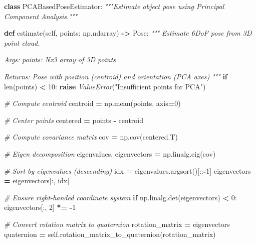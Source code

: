 \documentclass[
]{article}
\newenvironment{Shaded}{\begin{snugshade}}{\end{snugshade}}
\newcommand{\BuiltInTok}[1]{#1}
\newcommand{\CommentTok}[1]{\textcolor[rgb]{0.56,0.35,0.01}{\textit{#1}}}
\newcommand{\ControlFlowTok}[1]{\textcolor[rgb]{0.13,0.29,0.53}{\textbf{#1}}}
\newcommand{\DecValTok}[1]{\textcolor[rgb]{0.00,0.00,0.81}{#1}}
\newcommand{\KeywordTok}[1]{\textcolor[rgb]{0.13,0.29,0.53}{\textbf{#1}}}
\newcommand{\NormalTok}[1]{#1}
\newcommand{\OperatorTok}[1]{\textcolor[rgb]{0.81,0.36,0.00}{\textbf{#1}}}
\newcommand{\PreprocessorTok}[1]{\textcolor[rgb]{0.56,0.35,0.01}{\textit{#1}}}
\newcommand{\StringTok}[1]{\textcolor[rgb]{0.31,0.60,0.02}{#1}}
\newcommand{\VariableTok}[1]{\textcolor[rgb]{0.00,0.00,0.00}{#1}}
\begin{document}
\begin{Shaded}
\begin{Highlighting}[]
\KeywordTok{class}\NormalTok{ PCABasedPoseEstimator:}
    \CommentTok{"""Estimate object pose using Principal Component Analysis."""}

    \KeywordTok{def}\NormalTok{ estimate(}\VariableTok{self}\NormalTok{, points: np.ndarray) }\OperatorTok{{-}\textgreater{}}\NormalTok{ Pose:}
        \CommentTok{"""}
\CommentTok{        Estimate 6DoF pose from 3D point cloud.}

\CommentTok{        Args:}
\CommentTok{            points: Nx3 array of 3D points}

\CommentTok{        Returns:}
\CommentTok{            Pose with position (centroid) and orientation (PCA axes)}
\CommentTok{        """}
        \ControlFlowTok{if} \BuiltInTok{len}\NormalTok{(points) }\OperatorTok{\textless{}} \DecValTok{10}\NormalTok{:}
            \ControlFlowTok{raise} \PreprocessorTok{ValueError}\NormalTok{(}\StringTok{"Insufficient points for PCA"}\NormalTok{)}

        \CommentTok{\# Compute centroid}
\NormalTok{        centroid }\OperatorTok{=}\NormalTok{ np.mean(points, axis}\OperatorTok{=}\DecValTok{0}\NormalTok{)}

        \CommentTok{\# Center points}
\NormalTok{        centered }\OperatorTok{=}\NormalTok{ points }\OperatorTok{{-}}\NormalTok{ centroid}

        \CommentTok{\# Compute covariance matrix}
\NormalTok{        cov }\OperatorTok{=}\NormalTok{ np.cov(centered.T)}

        \CommentTok{\# Eigen decomposition}
\NormalTok{        eigenvalues, eigenvectors }\OperatorTok{=}\NormalTok{ np.linalg.eig(cov)}

        \CommentTok{\# Sort by eigenvalues (descending)}
\NormalTok{        idx }\OperatorTok{=}\NormalTok{ eigenvalues.argsort()[::}\OperatorTok{{-}}\DecValTok{1}\NormalTok{]}
\NormalTok{        eigenvectors }\OperatorTok{=}\NormalTok{ eigenvectors[:, idx]}

        \CommentTok{\# Ensure right{-}handed coordinate system}
        \ControlFlowTok{if}\NormalTok{ np.linalg.det(eigenvectors) }\OperatorTok{\textless{}} \DecValTok{0}\NormalTok{:}
\NormalTok{            eigenvectors[:, }\DecValTok{2}\NormalTok{] }\OperatorTok{*=} \OperatorTok{{-}}\DecValTok{1}

        \CommentTok{\# Convert rotation matrix to quaternion}
\NormalTok{        rotation\_matrix }\OperatorTok{=}\NormalTok{ eigenvectors}
\NormalTok{        quaternion }\OperatorTok{=} \VariableTok{self}\NormalTok{.rotation\_matrix\_to\_quaternion(rotation\_matrix)}


\end{Highlighting}
\end{Shaded}
\end{document}
